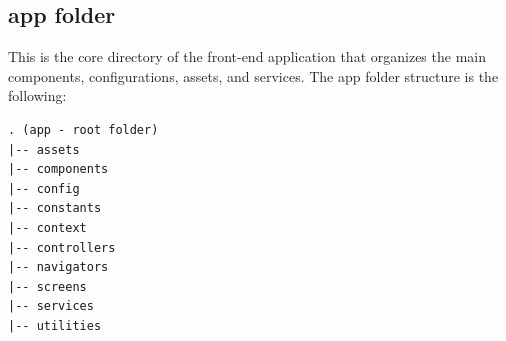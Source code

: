 \subsection{app folder}
This is the core directory of the front-end application that organizes the main components, configurations, assets, and services. The app folder structure is the following:

\vspace{5mm}

\begin{lstlisting}[caption=app Folder Structure]
. (app - root folder)
|-- assets
|-- components
|-- config
|-- constants
|-- context
|-- controllers
|-- navigators
|-- screens
|-- services
|-- utilities
\end{lstlisting}

\vspace{5mm}

